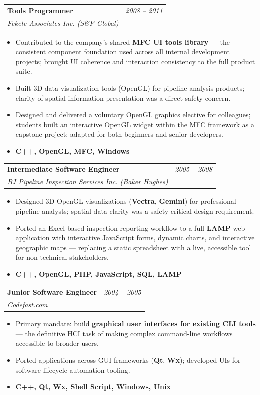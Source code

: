 \documentclass[11pt]{article}
\makeatletter
\newcommand{\tech}[1]{\textcolor{secondary}{\textbf{#1}}}
\newcommand{\experience}[4]{%
  \vspace{4pt}
  \begin{tabular*}{\textwidth}{@{}l@{\extracolsep{\fill}}r@{}}
    \textbf{#1} & \textit{#2} \\
    \textit{\small#3} & \textit{\small#4}
  \end{tabular*}
  \vspace{-4pt}
}
\makeatother
\begin{document}
\experience{Tools Programmer}{2008 -- 2011}{Fekete Associates Inc. (S\&P Global)}{}
\begin{itemize}
    \item Contributed to the company's shared \tech{MFC UI tools library} --- the consistent component foundation used across all internal development projects; brought UI coherence and interaction consistency to the full product suite.
    \item Built 3D data visualization tools (OpenGL) for pipeline analysis products; clarity of spatial information presentation was a direct safety concern.
    \item Designed and delivered a voluntary OpenGL graphics elective for colleagues; students built an interactive OpenGL widget within the MFC framework as a capstone project; adapted for both beginners and senior developers.
    \item[] \tech{C++, OpenGL, MFC, Windows}
\end{itemize}

\experience{Intermediate Software Engineer}{2005 -- 2008}{BJ Pipeline Inspection Services Inc. (Baker Hughes)}{}
\begin{itemize}
    \item Designed 3D OpenGL visualizations (\tech{Vectra}, \tech{Gemini}) for professional pipeline analysts; spatial data clarity was a safety-critical design requirement.
    \item Ported an Excel-based inspection reporting workflow to a full \tech{LAMP} web application with interactive JavaScript forms, dynamic charts, and interactive geographic maps --- replacing a static spreadsheet with a live, accessible tool for non-technical stakeholders.
    \item[] \tech{C++, OpenGL, PHP, JavaScript, SQL, LAMP}
\end{itemize}

\experience{Junior Software Engineer}{2004 -- 2005}{Codefast.com}{}
\begin{itemize}
    \item Primary mandate: build \textbf{graphical user interfaces for existing CLI tools} --- the definitive HCI task of making complex command-line workflows accessible to broader users.
    \item Ported applications across GUI frameworks (\tech{Qt}, \tech{Wx}); developed UIs for software lifecycle automation tooling.
    \item[] \tech{C++, Qt, Wx, Shell Script, Windows, Unix}
\end{itemize}
\end{document}
